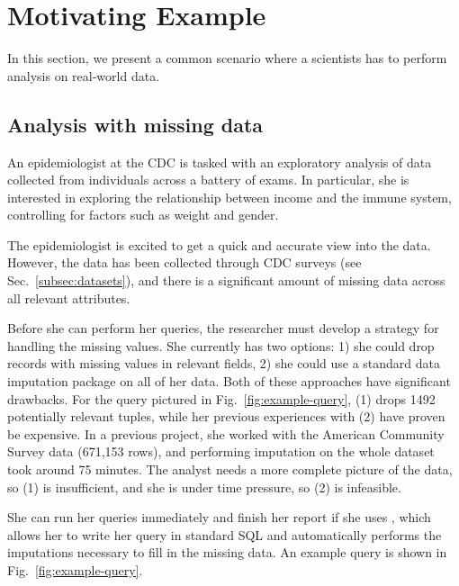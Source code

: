 \section{Motivating Example}
In this section, we present a common scenario where a scientists
has to perform analysis on real-world data.

\subsection{Analysis with missing data}
An epidemiologist at the CDC is tasked with an 
exploratory analysis of data collected from individuals across
a battery of exams. In particular, she is interested in exploring
the relationship between income and the immune system,
controlling for factors such as weight and gender.


The epidemiologist is excited
to get a quick and accurate view into the data. However,
the data has been collected through CDC surveys (see Sec.~\ref{subsec:datasets}),
and there is a significant amount of missing data across all
relevant attributes. 

Before she can perform her queries, the researcher must develop a strategy
for handling the missing values. She currently has two options:
1) she could drop records with missing values in relevant fields,
2) she could use a standard data imputation package on all of her data. Both of these
approaches have significant drawbacks. For the query pictured in 
Fig.~\ref{fig:example-query}, (1) drops 1492 potentially relevant tuples,
while her previous experiences with (2) have proven be expensive. In a previous project, she
worked with the American Community Survey data (671,153 rows), and performing imputation on the whole
dataset took around 75 minutes. The analyst needs a more complete picture
of the data, so (1) is insufficient, and she is under time pressure, so (2)
is infeasible.

She can run her queries immediately and finish her report if
she uses \ProjectName{}, which allows her to write her
query in standard SQL and automatically performs the imputations necessary to fill in the missing data.
An example query is shown in Fig.~\ref{fig:example-query}.

